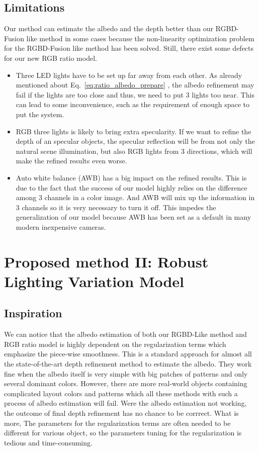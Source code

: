 \subsection{Limitations}
Our method can estimate the albedo and the depth better than our RGBD-Fusion like method in some cases because the non-linearity optimization problem for the RGBD-Fusion like method has been solved.
Still, there exist some defects for our new RGB ratio model.
\begin{itemize}
\item Three LED lights have to be set up far away from each other.
	As already mentioned about Eq.~\ref{eq:ratio_albedo_prepare} , the albedo refinement may fail if the lights are too close and thus, we need to put 3 lights too near. 
	This can lead to some inconvenience, such as the requirement of enough space to put the system.
\item RGB three lights is likely to bring extra specularity.
	 If we want to refine the depth of an specular objects, the specular reflection will be from not only the natural scene illumination, but also RGB lights from 3 directions, which will make the refined results even worse.
	 
\item Auto white balance (AWB) has a big impact on the refined results.
	This is due to the fact that the success of our model highly relies on the difference among 3 channels in a color image.
	And AWB will mix up the information in 3 channels so it is very necessary to turn it off.
	This impedes the generalization of our model because AWB has been set as a default in many modern inexpensive cameras.
\end{itemize}


\section{Proposed method II: Robust Lighting Variation Model}

\subsection{Inspiration}
We can notice that the albedo estimation of both our RGBD-Like method and RGB ratio model is highly dependent on the regularization terms which emphasize the piece-wise smoothness.
This is a standard approach for almost all the state-of-the-art depth refinement method to estimate the albedo.
They work fine when the albedo itself is very simple with big patches of patterns and only several dominant colors.
However, there are more real-world objects containing complicated layout colors and patterns which all these methods with such a process of albedo estimation will fail.
Were the albedo estimation not working, the outcome of final depth refinement has no chance to be corrrect. 
What is more, The parameters for the regularization terms are often needed to be different for various object, so the parameters tuning for the regularization is tedious and time-consuming.

